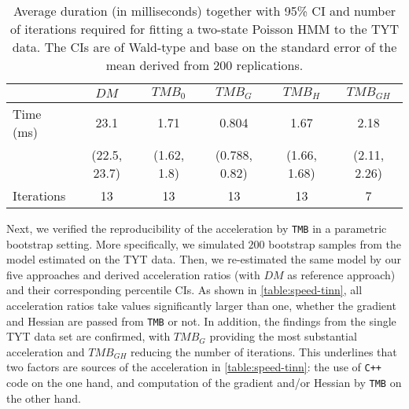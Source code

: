 \documentclass[bimj,fleqn]{w-art}\usepackage[]{graphicx}\usepackage[]{color}
\theoremstyle{plain}
\theoremstyle{definition}
\begin{document}
\begin{table}[ht]
\centering
\begin{tabular}{lccccc}
  \hline
 & \textit{${DM}$} & \textit{${TMB_0}$} & \textit{${TMB_G}$} & \textit{${TMB_H}$} & \textit{${TMB_{GH}}$} \\ 
  \hline
Time (ms) & 23.1 & 1.71 & 0.804 & 1.67 & 2.18 \\ 
   &  (22.5, 23.7)  &  (1.62, 1.8)  &  (0.788, 0.82)  &  (1.66, 1.68)  &  (2.11, 2.26)  \\ 
  Iterations & 13 & 13 & 13 & 13 & 7 \\ 
   \hline
\end{tabular}
\caption{Average duration (in milliseconds) together with 95\% CI and number of iterations required for fitting a two-state Poisson HMM to the TYT data. The CIs are of Wald-type and base on the standard error of the mean derived from 200 replications.} 
\label{table:speed-consistency-tinn}
\end{table}





% 

Next, we verified the reproducibility of the acceleration by {\tt{TMB}} in a parametric bootstrap setting. More specifically, we simulated $200$ bootstrap samples from the model estimated on the TYT data. Then, we re-estimated the same model by our five approaches and derived acceleration ratios (with $DM$ as reference approach) and their corresponding percentile CIs. As shown in \autoref{table:speed-tinn}, all acceleration ratios take values significantly larger than one, whether the gradient and Hessian are passed from {\tt{TMB}} or not. In addition, the findings from the single TYT data set are confirmed, with $TMB_G$ providing the most substantial acceleration and $TMB_{GH}$ reducing the number of iterations. This underlines that two factors are sources of the acceleration in \autoref{table:speed-tinn}: the use of {\tt{C++}} code on the one hand, and computation of the gradient and/or Hessian by {\tt TMB} on the other hand.  
\end{document}
